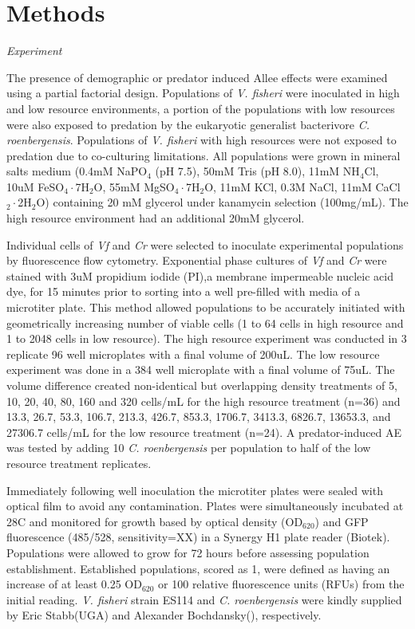 \documentclass[a4paper,10pt]{article}
\begin{document}
\section{Methods}
\textit{Experiment}

The presence of demographic or predator induced Allee effects were examined using a partial factorial design. Populations of \textit{V. fisheri} were inoculated in high and low resource environments, a portion of the populations with low resources were also exposed to predation by the eukaryotic generalist bacterivore \textit{C. roenbergensis}. Populations of \textit{V. fisheri} with high resources were not exposed to predation due to co-culturing limitations. All populations were grown in mineral salts medium (0.4mM NaPO$_{4}$ (pH 7.5), 50mM Tris (pH 8.0), 11mM NH$_{4}$Cl, 10uM  FeSO$_{4}\cdot$7H$_{2}$O, 55mM MgSO$_{4}\cdot$7H$_{2}$O, 11mM KCl, 0.3M NaCl, 11mM CaCl$_{2}\cdot$2H$_{2}$O) containing 20 mM glycerol under kanamycin selection (100mg/mL). The high resource environment had an additional 20mM glycerol. 

Individual cells of \textit{Vf} and \textit{Cr} were selected to inoculate experimental populations by fluorescence flow cytometry. Exponential phase cultures of \textit{Vf} and \textit{Cr} were stained with 3uM propidium iodide (PI),a membrane impermeable nucleic acid dye, for 15 minutes prior to sorting into a well pre-filled with media of a microtiter plate. This method allowed populations to be accurately initiated with geometrically increasing number of viable cells (1 to 64 cells in high resource and 1 to 2048 cells in low resource). The high resource experiment was conducted in 3 replicate 96 well microplates with a final volume of 200uL. The low resource experiment was done in a 384 well microplate with a final volume of 75uL. The volume difference created non-identical but overlapping density treatments of 5, 10, 20, 40, 80, 160 and 320 cells/mL for the high resource treatment (n=36) and  13.3, 26.7, 53.3, 106.7, 213.3, 426.7, 853.3, 1706.7, 3413.3, 6826.7, 13653.3, and 27306.7 cells/mL for the low resource treatment (n=24). A predator-induced AE was tested by adding 10 \textit{C. roenbergensis} per population to half of the low resource treatment replicates.  

Immediately following well inoculation the microtiter plates were sealed with optical film to avoid any contamination. Plates were simultaneously incubated at 28C and monitored for growth based by optical density (OD$_{620}$) and GFP fluorescence (485/528, sensitivity=XX) in a Synergy H1 plate reader (Biotek). Populations were allowed to grow for 72 hours before assessing population establishment. Established populations, scored as 1, were defined as having an increase of at least 0.25 OD$_{620}$ or 100 relative fluorescence units (RFUs) from the initial reading.  \textit{V. fisheri} strain ES114  and \textit{C. roenbergensis} were kindly supplied by Eric Stabb(UGA) and Alexander Bochdansky(), respectively.  
	
\end{document}
